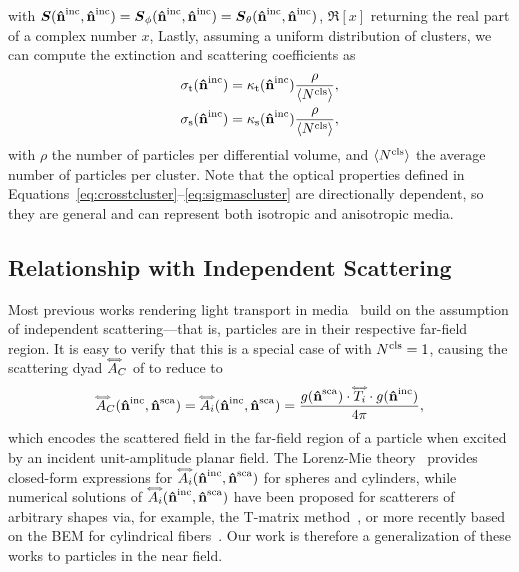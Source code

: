 %
with $\boldsymbol{S}(\mathbf{\hat{n}}^{\text{inc}},\mathbf{\hat{n}}^{\text{inc}})=\boldsymbol{S}_\phi(\mathbf{\hat{n}}^{\text{inc}},\mathbf{\hat{n}}^{\text{inc}})=\boldsymbol{S}_\theta(\mathbf{\hat{n}}^{\text{inc}},\mathbf{\hat{n}}^{\text{inc}})$, $\Re[x]$ returning the real part of a complex number $x$, Lastly, assuming a uniform distribution of clusters, we can compute the extinction and scattering coefficients as
%
\begin{align}
    \label{eq:sigmatcluster}
    \sigma_\mathrm{t}(\mathbf{\hat{n}}^{\text{inc}}) &= \kappa_\mathrm{t}(\mathbf{\hat{n}}^{\text{inc}}) \frac{\rho}{{\langle {N^\text{cls}} \rangle}}, \\
    \label{eq:sigmascluster}
    \sigma_\mathrm{s}(\mathbf{\hat{n}}^{\text{inc}}) &= \kappa_\mathrm{s}(\mathbf{\hat{n}}^{\text{inc}}) \frac{\rho}{{\langle {N^\text{cls}} \rangle}},
\end{align}
%
with $\rho$ the number of particles per differential volume, and ${\langle {N^\text{cls}} \rangle}$ the average number of particles per cluster. Note that the optical properties defined in Equations~\eqref{eq:crosstcluster}--\eqref{eq:sigmascluster} are directionally dependent, so they are general and can represent both isotropic and anisotropic media. 




\subsection{Relationship with Independent Scattering}
\label{ssec:ours_indep_scat}
%
Most previous works rendering light transport in media~\cite{novak2018monte} build on the assumption of independent scattering---that is, particles are in their respective far-field region.
It is easy to verify that this is a special case of  with ${N^\text{cls}}=1$, causing 
the scattering dyad $\accentset{\Longleftrightarrow}{A}_C$ of  to reduce to
%
\begin{equation}
    \label{eq:farscatmie}
    \accentset{\Longleftrightarrow}{A}_C(\mathbf{\hat{n}}^{\text{inc}},\mathbf{\hat{n}}^{\text{sca}}) = \accentset{\Longleftrightarrow}{A}_i(\mathbf{\hat{n}}^{\text{inc}},\mathbf{\hat{n}}^{\text{sca}}) = \frac{g(\mathbf{\hat{n}}^{\text{sca}})\cdot \accentset{\Longleftrightarrow}{T}_i  \cdot g(\mathbf{\hat{n}}^{\text{inc}})}{4\pi},
\end{equation}
%
which encodes the scattered field in the far-field region of a particle when excited by an incident unit-amplitude planar field. 
%
The Lorenz-Mie theory~\cite{hulst1981light} provides closed-form expressions for $\accentset{\Longleftrightarrow}{A}_i(\mathbf{\hat{n}}^{\text{inc}},\mathbf{\hat{n}}^{\text{sca}})$ for spheres and cylinders, while numerical solutions of $\accentset{\Longleftrightarrow}{A}_i(\mathbf{\hat{n}}^{\text{inc}},\mathbf{\hat{n}}^{\text{sca}})$ have been proposed for scatterers of arbitrary shapes via, for example, the T-matrix method~\cite{waterman1965matrix}, or more recently based on the BEM for cylindrical fibers~\cite{xia2020wave}. Our work is therefore a generalization of these works to particles in the near field. 
